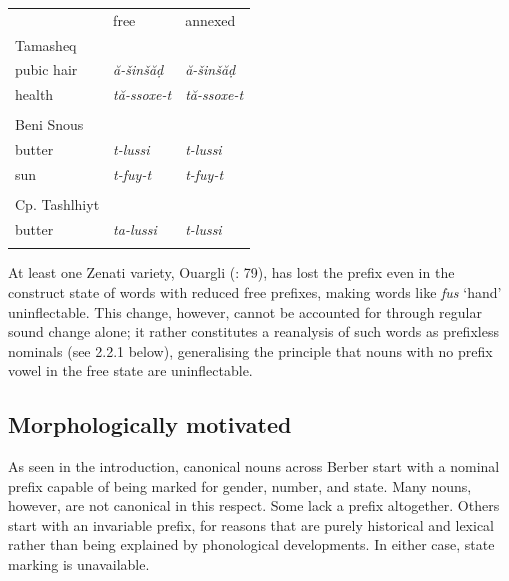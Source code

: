 \documentclass[output=paper]{langscibook}
\begin{document}
\begin{tabularx}{\textwidth}{XXX}
 & free & annexed\\
\lsptoprule
Tamasheq \citep{Heath2006} &  & \\
pubic hair & \textit{ă-šinšăḍ} & \textit{ă-šinšăḍ}\\
health & \textit{tă-ssoxe-t} & \textit{tă-ssoxe-t}\\
&  & \\
Beni Snous \citep{Destaing1914} &  & \\
butter & \textit{t-lussi} & \textit{t-lussi}\\
sun & \textit{t-fuy-t} & \textit{t-fuy-t}\\
&  & \\
Cp. Tashlhiyt \citep{Destaing1920} &  & \\
butter & \textit{ta-lussi} & \textit{t-lussi}\\
\lspbottomrule
\end{tabularx}
\begin{styleStandarduser}
At least one Zenati variety, Ouargli (\citealt{DelheureOchoa2019}: 79), has lost the prefix even in the construct state of words with reduced free prefixes, making words like \textit{fus} ‘hand’ uninflectable. This change, however, cannot be accounted for through regular sound change alone; it rather constitutes a reanalysis of such words as prefixless nominals (see 2.2.1 below), generalising the principle that nouns with no prefix vowel in the free state are uninflectable.
\end{styleStandarduser}

\subsection{Morphologically motivated} %
\begin{styleStandarduser}
As seen in the introduction, canonical nouns across Berber start with a nominal prefix capable of being marked for gender, number, and state. Many nouns, however, are not canonical in this respect. Some lack a prefix altogether. Others start with an invariable prefix, for reasons that are purely historical and lexical rather than being explained by phonological developments. In either case, state marking is unavailable.
\end{styleStandarduser}
\end{document}
